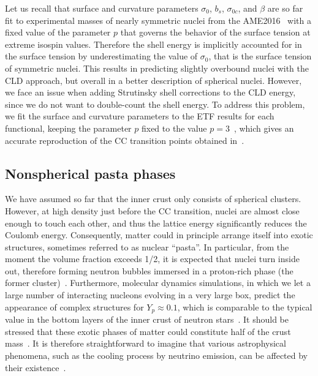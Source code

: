 Let us recall that surface and curvature parameters $\sigma_0$, $b_s$, 
$\sigma_{0c}$, and $\beta$ are so far fit to experimental masses of nearly 
symmetric nuclei from the AME2016~\cite{Huang2017} with a fixed value of the
parameter $p$ that governs the behavior of the surface tension at extreme
isospin values. 
Therefore the shell energy is implicitly accounted for in the surface tension 
by underestimating the value of $\sigma_0$, that is the surface tension of symmetric 
nuclei. This results in predicting slightly overbound nuclei with the CLD
approach, but overall in a better description of spherical nuclei. 
However, we face an issue when adding Strutinsky shell corrections to
the CLD energy, since we do not want to double-count the shell energy. To
address this problem, we fit the surface and curvature parameters to the ETF 
results for each functional, keeping the parameter $p$ fixed to the value
$p=3$~\cite{Carreau2019}, which gives an accurate reproduction of the 
CC transition points obtained in~\cite{Pearson2019}.

\subsection{Nonspherical pasta phases}\label{subsec:pasta}

We have assumed so far that the inner crust only consists of spherical 
clusters. However, at high density just before the CC transition, 
nuclei are almost close enough to touch each other, and thus 
the lattice energy significantly reduces the Coulomb energy. Consequently,
matter could in principle arrange itself into exotic structures, sometimes
referred to as nuclear ``pasta''.
In particular, from the moment the volume fraction exceeds 1/2, it is expected 
that nuclei turn inside out, therefore forming neutron bubbles 
immersed in a proton-rich phase (the former cluster)~\cite{BBP}. Furthermore, 
molecular dynamics simulations, in which we let a large number of 
interacting nucleons evolving in a very large box, predict the appearance of 
complex structures for $Y_p \approx 0.1$, which is comparable to the typical 
value in the bottom layers of the inner crust of neutron 
stars~\cite{Watanabe2003}. It should be stressed that these exotic phases of 
matter could constitute half of the crust mass~\cite{Lorenz1993}. It is
therefore straightforward to imagine that various astrophysical phenomena, such
as the cooling process by neutrino emission, can be affected by 
their existence~\cite{Watanabe2011}.

